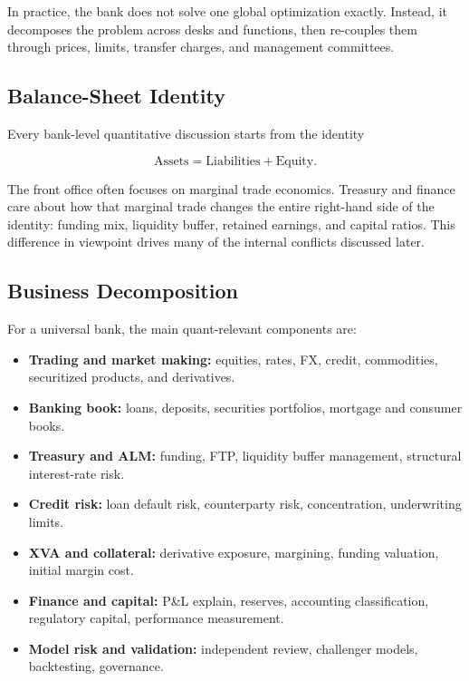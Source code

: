 \documentclass{apex_mdd}
\begin{document}
In practice, the bank does not solve one global optimization exactly. Instead, it decomposes the problem across desks and functions, then re-couples them through prices, limits, transfer charges, and management committees.

\subsection{Balance-Sheet Identity}

Every bank-level quantitative discussion starts from the identity
\begin{formulabox}
\[
  \mathrm{Assets} = \mathrm{Liabilities} + \mathrm{Equity}.
\]
\end{formulabox}

The front office often focuses on marginal trade economics. Treasury and finance care about how that marginal trade changes the entire right-hand side of the identity: funding mix, liquidity buffer, retained earnings, and capital ratios. This difference in viewpoint drives many of the internal conflicts discussed later.

\subsection{Business Decomposition}

For a universal bank, the main quant-relevant components are:
\begin{itemize}
  \item \textbf{Trading and market making:} equities, rates, FX, credit, commodities, securitized products, and derivatives.
  \item \textbf{Banking book:} loans, deposits, securities portfolios, mortgage and consumer books.
  \item \textbf{Treasury and ALM:} funding, FTP, liquidity buffer management, structural interest-rate risk.
  \item \textbf{Credit risk:} loan default risk, counterparty risk, concentration, underwriting limits.
  \item \textbf{XVA and collateral:} derivative exposure, margining, funding valuation, initial margin cost.
  \item \textbf{Finance and capital:} P\&L explain, reserves, accounting classification, regulatory capital, performance measurement.
  \item \textbf{Model risk and validation:} independent review, challenger models, backtesting, governance.
\end{itemize}
\end{document}
